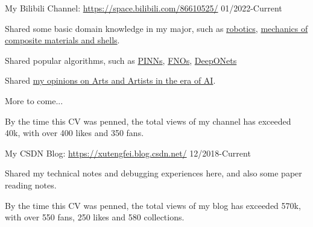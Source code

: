 



\begin{cventries}


  \cventry
    {My Bilibili Channel: \href{https://space.bilibili.com/86610525}{https://space.bilibili.com/86610525/}} %
    {01/2022-Current} %
    {
      \begin{cvitems} %
        \item Shared some basic domain knowledge in my major, such as \href{https://www.bilibili.com/video/BV1p44y1M76N/?spm_id_from=333.999.0.0}{robotics}, \href{https://www.bilibili.com/video/BV1pP4y1P7x5/?spm_id_from=333.999.0.0}{mechanics of composite materials and shells}.
        \item Shared popular algorithms, such as \href{https://www.bilibili.com/video/BV1w34y1h72y/?spm_id_from=333.999.0.0}{PINNs}, \href{https://www.bilibili.com/video/BV1me4y1C716/?spm_id_from=333.999.0.0}{FNOs}, \href{https://www.bilibili.com/video/BV1WG4y167uw/?spm_id_from=333.999.0.0}{DeepONets}
        \item Shared \href{https://www.bilibili.com/video/BV1mV4y1G7ew/?spm_id_from=333.999.0.0}{my opinions on Arts and Artists in the era of AI}.
        \item More to come...
        \item By the time this CV was penned, the total views of my channel has exceeded {\color{red}40k}, with over {\color{red}400} likes and {\color{red}350} fans.
      \end{cvitems}
    }
  \cventry
    {My CSDN Blog: \href{https://xutengfei.blog.csdn.net/}{https://xutengfei.blog.csdn.net/}} %
    {12/2018-Current} %
    {
      \begin{cvitems} %
        \item Shared my technical notes and debugging experiences here, and also some paper reading notes.
        \item By the time this CV was penned, the total views of my blog has exceeded {\color{red}570k}, with over {\color{red}550} fans, {\color{red}250} likes and {\color{red}580} collections.
      \end{cvitems}
    }


\end{cventries}
